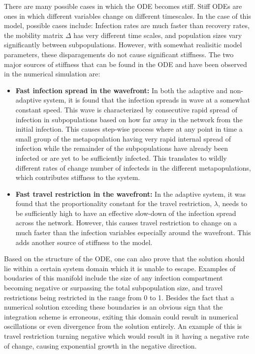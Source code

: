 There are many possible cases in which the ODE becomes stiff. Stiff ODEs are ones in which different variables change on different timescales. In the case of this model, possible cases include: Infection rates are much faster than recovery rates, the mobility matrix $\Delta$ has very different time scales, and population sizes vary significantly between subpopulations. However, with somewhat realisitic model parameters, these disparagements do not cause significant stiffness. The two major sources of stiffness that can be found in the ODE and have been observed in the numerical simulation are:
\begin{itemize}
	\item \textbf{Fast infection spread in the wavefront:} In both the adaptive and non-adaptive system, it is found that the infection spreads in wave at a somewhat constant speed. This wave is characterized by consecutive rapid spread of infection in subpopulations based on how far away in the network from the initial infection. This causes step-wise process where at any point in time a small group of the metapopulation having very rapid internal spread of infection while the remainder of the subpopulations have already been infected or are yet to be sufficiently infected. This translates to wildly different rates of change number of infecteds in the different metapopulations, which contributes stiffness to the system.
	\item \textbf{Fast travel restriction in the wavefront:} In the adaptive system, it was found that the proportionality constant for the  travel restriction, $\lambda$, needs to be sufficiently high to have an effective slow-down of the infection spread across the network. However, this causes travel restriction to change on a much faster than the infection variables especially around the wavefront. This adds another source of stiffness to the model. 
    
\end{itemize}

Based on the structure of the ODE, one can also prove that the solution should lie within a certain system domain which it is unable to escape. Examples of boudaries of this manifold include the size of any infection compartment becoming negative or surpassing the total subpopulation size, and travel restrictions being restricted in the range from 0 to 1. Besides the fact that a numerical solution exceding these boundaries is an obvious sign that the integration scheme is erroneous, exiting this domain could result in numerical oscillations or even divergence from the solution entirely. An example of this is travel restriction turning negative which would result in it having a negative rate of change, causing exponential growth in the negative direction.\\

